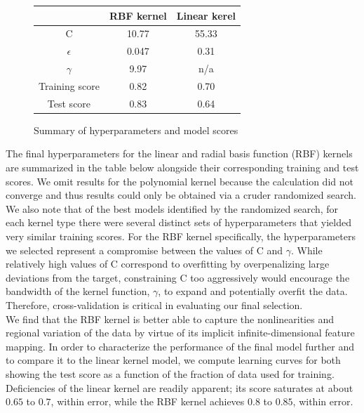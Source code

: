 \documentclass[12]{article}
\begin{document}
\begin{figure}[H]
\centering
\begin{tabular}{ |c|c|c| } 
 \hline
       & \textbf{RBF kernel} & \textbf{Linear kerel} \\ 
 \hline
 C              & 10.77 & 55.33 \\ 
 $\epsilon$     & 0.047 & 0.31 \\
 $\gamma$       & 9.97 & n/a \\
 Training score & 0.82 & 0.70 \\
 Test score     & 0.83 & 0.64 \\
 \hline
\end{tabular}
\caption{\label{fig:Results}Summary of hyperparameters and model scores}
\end{figure}

\noindent The final hyperparameters for the linear and radial basis function (RBF) kernels are summarized in the table below alongside their corresponding training and test scores. We omit results for the polynomial kernel because the calculation did not converge and thus results could only be obtained via a cruder randomized search. We also note that of the best models identified by the randomized search, for each kernel type there were several distinct sets of hyperparameters that yielded very similar training scores. For the RBF kernel specifically, the hyperparameters we selected represent a compromise between the values of C and $\gamma$. While relatively high values of C correspond to overfitting by overpenalizing large deviations from the target, constraining C too aggressively would encourage the bandwidth of the kernel function, $\gamma$, to expand and potentially overfit the data. Therefore, cross-validation is critical in evaluating our final selection.\\  

\noindent We find that the RBF kernel is better able to capture the nonlinearities and regional variation of the data by virtue of its implicit infinite-dimensional feature mapping. In order to characterize the performance of the final model further and to compare it to the linear kernel model, we compute learning curves for both showing the test score as a function of the fraction of data used for training. Deficiencies of the linear kernel are readily apparent; its score saturates at about $0.65$ to $0.7$, within error, while the RBF kernel achieves $0.8$ to $0.85$, within error. 
\end{document}
